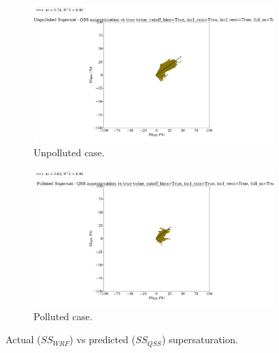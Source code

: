 \documentclass{article}
\begin{document}
\begin{figure}[ht]
	\centering
	\begin{subfigure}{0.7\textwidth}
		\includegraphics[width=\textwidth]{revmywrf/v12_ss_qss_vs_ss_wrf_Unpolluted_figure.png}
		\caption{Unpolluted case.}
		\label{wrfvsqssunpoll}
	\end{subfigure}
	\begin{subfigure}{0.7\textwidth}
		\includegraphics[width=\textwidth]{revmywrf/v12_ss_qss_vs_ss_wrf_Polluted_figure.png}
		\caption{Polluted case.}
		\label{wrfvsqsspoll}
	\end{subfigure}
	\caption{Actual ($SS_{WRF}$) vs predicted ($SS_{QSS}$) supersaturation.}
	\label{wrfvsqss}
\end{figure}
\end{document}
